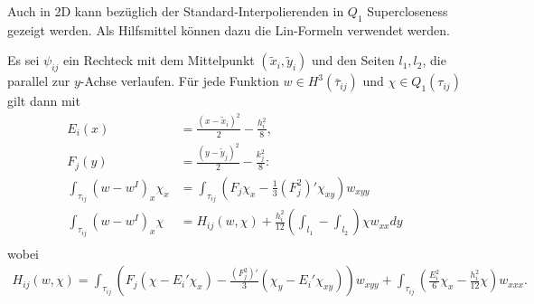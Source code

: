 Auch in 2D kann bezüglich der Standard-Interpolierenden in $Q_{1}$ Supercloseness gezeigt werden. Als Hilfsmittel können dazu die Lin-Formeln verwendet werden.
\begin{lemma}\label{lem:7-15}
  Es sei $\psi_{ij}$ ein Rechteck mit dem Mittelpunkt $(\tilde x_{i}, \tilde y_{i})$ und den Seiten $l_{1}, l_{2}$, die parallel zur $y$-Achse verlaufen. Für jede Funktion $w \in H^{3}(\bar \tau_{ij})$ und $\chi \in Q_{1}(\tau_{ij})$ gilt dann mit
  \begin{align*}
    E_{i}(x) &= \frac{(x - \tilde x_{i})^{2}} 2 - \frac{h_{i}^{2}}8, \\
    F_{j}(y) &= \frac{(y - \tilde y_{j})^{2}} 2 - \frac{k_{j}^{2}}8:\\
    \int_{\tau_{ij}} (w - w^{I})_{x} \chi_{x} &= \int_{\tau_{ij}} (F_{j} \chi_{x} - \frac 13 (F_{j}^{2})' \chi_{xy})w_{xyy}\\
    \int_{\tau_{ij}} (w - w^{I})_{x} \chi &= H_{ij}(w, \chi) + \frac{h_{i}^{2}}{12}(\int_{l_{1}} - \int_{l_{2}}) \chi w_{xx} dy\\
  \end{align*}
wobei
\begin{align*}
  H_{ij}(w, \chi) = \int_{\tau_{ij}} (F_{j}(\chi - E_{i}' \chi_{x}) - \frac{(F_{j}^{2})'}3(\chi_{y} - E_{i}' \chi_{xy})) w_{xyy} + \int_{\tau_{ij}}(\frac{E_{i}^{2}} 6 \chi_{x} - \frac{h_{i}^{2}}{12} \chi)w_{xxx}. 
\end{align*}
\end{lemma}
